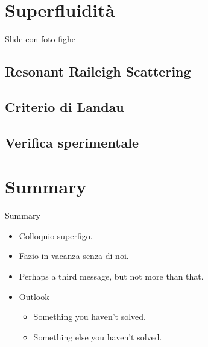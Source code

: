 \documentclass[10pt]{beamer}
\begin{document}
\section{Superfluidità}
\begin{frame}{Slide con foto fighe}
 
\end{frame}

\subsection{Resonant Raileigh Scattering}
\subsection{Criterio di Landau}
\subsection{Verifica sperimentale}

\section*{Summary}

\begin{frame}{Summary}
  \begin{itemize}
  \item
    Colloquio \alert{superfigo}.
  \item
    \alert{Fazio in vacanza} senza di noi.
  \item
    Perhaps a \alert{third message}, but not more than that.
  \end{itemize}
  
  \begin{itemize}
  \item
    Outlook
    \begin{itemize}
    \item
      Something you haven't solved.
    \item
      Something else you haven't solved.
    \end{itemize}
  \end{itemize}
\end{frame}
\end{document}
